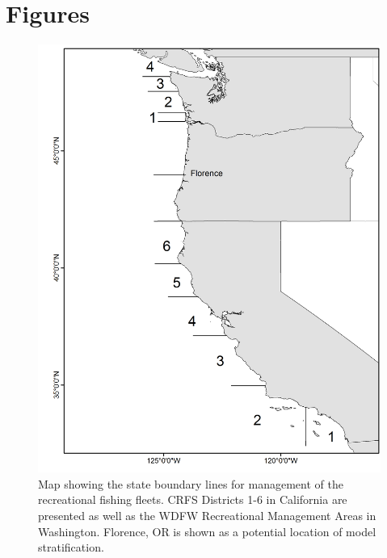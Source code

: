 \documentclass[12pt,]{article}
\begin{document}
\FloatBarrier

\FloatBarrier

\newpage

\section{Figures}\label{figures}

\begin{figure}[htbp]
\centering
\includegraphics{Figures/boundary_map.png}
\caption{Map showing the state boundary lines for management of the
recreational fishing fleets. CRFS Districts 1-6 in California are
presented as well as the WDFW Recreational Management Areas in
Washington. Florence, OR is shown as a potential location of model
stratification. \label{fig:boundary_map}}
\end{figure}
\end{document}
